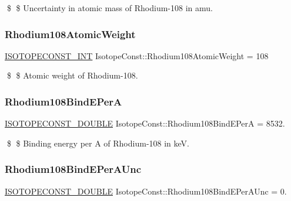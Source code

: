 \$ \$ Uncertainty in atomic mass of Rhodium-\/108 in amu. \mbox{\label{group___isotope_const-_rhodium-_rh108_ga36149ba214a102f48cf8ac83f39deeb5}} 
\subsubsection{\texorpdfstring{Rhodium108\+Atomic\+Weight}{Rhodium108AtomicWeight}}
{\footnotesize\ttfamily \mbox{\hyperlink{group___isotope_const-_macros_ga5f18360b3e99483a35c32d789e62621c}{I\+S\+O\+T\+O\+P\+E\+C\+O\+N\+S\+T\+\_\+\+I\+NT}} Isotope\+Const\+::\+Rhodium108\+Atomic\+Weight = 108}

\$ \$ Atomic weight of Rhodium-\/108. \mbox{\label{group___isotope_const-_rhodium-_rh108_gadaabb90e3df32331af9ccd6811ad65a4}} 
\subsubsection{\texorpdfstring{Rhodium108\+Bind\+E\+PerA}{Rhodium108BindEPerA}}
{\footnotesize\ttfamily \mbox{\hyperlink{group___isotope_const-_macros_ga8f45a7272ce02c0b4c65c44636ed719a}{I\+S\+O\+T\+O\+P\+E\+C\+O\+N\+S\+T\+\_\+\+D\+O\+U\+B\+LE}} Isotope\+Const\+::\+Rhodium108\+Bind\+E\+PerA = 8532.}

\$ \$ Binding energy per A of Rhodium-\/108 in keV. \mbox{\label{group___isotope_const-_rhodium-_rh108_ga0c393e758fdaecdcf4aa5c77d923ac08}} 
\subsubsection{\texorpdfstring{Rhodium108\+Bind\+E\+Per\+A\+Unc}{Rhodium108BindEPerAUnc}}
{\footnotesize\ttfamily \mbox{\hyperlink{group___isotope_const-_macros_ga8f45a7272ce02c0b4c65c44636ed719a}{I\+S\+O\+T\+O\+P\+E\+C\+O\+N\+S\+T\+\_\+\+D\+O\+U\+B\+LE}} Isotope\+Const\+::\+Rhodium108\+Bind\+E\+Per\+A\+Unc = 0.}

